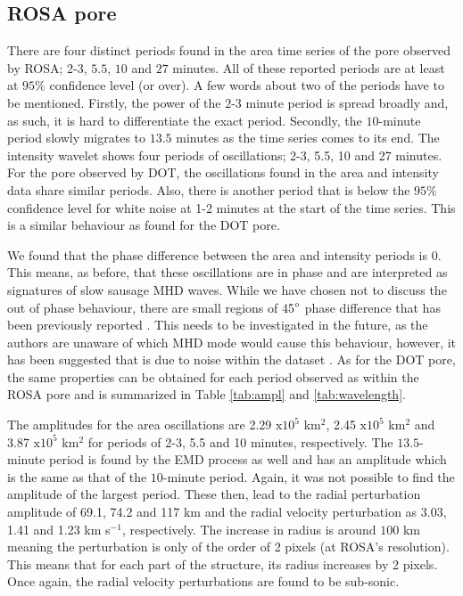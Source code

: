    \subsection{ROSA pore}
    
    There are four distinct periods found in the area time series of the pore observed by ROSA; 2-3, $5.5$, $10$ and $27$ minutes.
    All of these reported periods are at least at $95\%$ confidence level (or over).
    A few words about two of the periods have to be mentioned.
    Firstly, the power of the $2$-$3$ minute period is spread broadly and, as such, it is hard to differentiate the exact period.
    Secondly, the $10$-minute period slowly migrates to $13.5$ minutes as the time series comes to its end.
    The intensity wavelet shows four periods of oscillations; 2-3, 5.5, 10 and 27 minutes.
    For the pore observed by DOT, the oscillations found in the area and intensity data share similar periods.
    Also, there is another period that is below the $95\%$ confidence level for white noise at 1-2 minutes at the start of the time series.
    This is a similar behaviour as found for the DOT pore.
    
    We found that the phase difference between the area and intensity periods is 0\degree.
    This means, as before, that these oscillations are in phase and are interpreted as signatures of slow sausage MHD waves.
    While we have chosen not to discuss the out of phase behaviour, there are small regions of 45$\degree$ phase difference that has been previously reported \citep{Dorotovic2014}.
    This needs to be investigated in the future, as the authors are unaware of which MHD mode would cause this behaviour, however, it has been suggested that is due to noise within the dataset \citep{2015A&A...579A..73M}.
    As for the DOT pore, the same properties can be obtained for each period observed as within the ROSA pore and is summarized in Table \ref{tab:ampl} and \ref{tab:wavelength}.
    
	The amplitudes for the area oscillations are 2.29 $\mathrm{x}10^5$ km$^2$, 2.45 $\mathrm{x}10^5$ km$^2$ and 3.87 $\mathrm{x}10^5$ km$^2$ for periods of 2-3, 5.5 and 10 minutes, respectively.
	The $13.5$-minute period is found by the EMD process as well and has an amplitude which is the same as that of the $10$-minute period. 
	Again, it was not possible to find the amplitude of the largest period.
	These then, lead to the radial perturbation amplitude of 69.1, 74.2 and 117 km and the radial velocity perturbation as 3.03, 1.41 and 1.23 km s$^{-1}$, respectively.
	The increase in radius is around $100$ km meaning the perturbation is only of the order of 2 pixels (at ROSA's resolution).
	This means that for each part of the structure, its radius increases by 2 pixels.
	Once again, the radial velocity perturbations are found to be sub-sonic.
	
